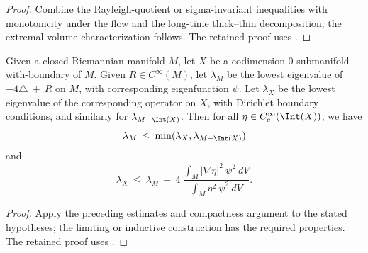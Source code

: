 \begin{proof}
\sketch Combine the Rayleigh-quotient or sigma-invariant inequalities with monotonicity under the flow and the long-time thick--thin decomposition; the extremal volume characterization follows.
The retained proof uses \cite[Pf. of Theorem 2.9]{Anderson}.
\end{proof}

\begin{lemma}
  \label{lem:kl-alternative-proof-cusp-incompressibility-estimates-spectral-geometry}
 \label{newprop1}
Given a closed Riemannian manifold $M$, let $X$ be a codimension-$0$
submanifold-with-boundary of $M$. Given $R \in C^\infty(M)$, let
$\lambda_M$ be the lowest eigenvalue of $-4\triangle \: + \: R$
on $M$, with corresponding eigenfunction $\psi$.
Let $\lambda_X$ be the lowest eigenvalue of the corresponding
operator on $X$, with Dirichlet boundary conditions, and similarly
for $\lambda_{M - \Int(X)}$. Then for all
$\eta \in C^\infty_c(\Int(X))$, we have
\begin{equation} \label{eig1}
\lambda_M \: \le \: \min(\lambda_X, \lambda_{M - \Int(X)})
\end{equation}
and
\begin{equation} \label{eig2}
\lambda_X \: \le \: \lambda_M \: + \: 4 \:
\frac{\int_M |\nabla \eta|^2 \: \psi^2 \: dV}{\int_M \eta^2 \:
\psi^2 \: dV}.
\end{equation}
\end{lemma}

\begin{proof}
\sketch Apply the preceding estimates and compactness argument to the stated hypotheses; the limiting or inductive construction has the required properties.
The retained proof uses \cite[Chapter XIII.15]{Reed-Simon}.
\end{proof}

